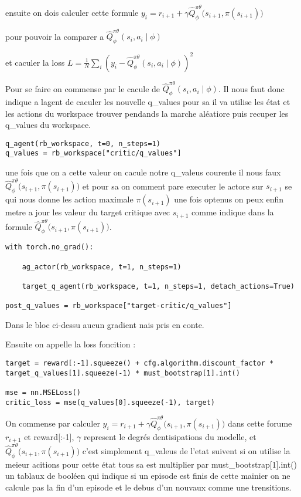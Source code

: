 \documentclass[12pt]{article}
\begin{document}
ensuite on dois calculer cette formule $ y_i = r_{i+1} + \gamma \hat{Q}^{\pi\theta}_{\phi} \big(s_{i+1}, \pi(s_{i+1})\big)$

pour pouvoir la comparer a $\hat{Q}_{\phi}^{\pi\theta}(s_i, a_i \mid \phi)$

et caculer la loss $L = \frac{1}{N} \sum_{i} \left( y_i - \hat{Q}_{\phi}^{\pi\theta}(s_i, a_i \mid \phi) \right)^2$

Pour se faire on commense par le cacule de $\hat{Q}_{\phi}^{\pi\theta}(s_i, a_i \mid \phi)$. 
Il nous faut donc indique a lagent de caculer les nouvelle q\_values pour sa il va utilise les état et les actions du workspace trouver pendands la marche aléatiore puis recuper les q\_values du workspace.



\begin{verbatim}
q_agent(rb_workspace, t=0, n_steps=1)
q_values = rb_workspace["critic/q_values"]
\end{verbatim}

une fois que on a cette valeur on cacule notre q\_valeus courente il nous faux $\hat{Q}^{\pi\theta}_{\phi} \big(s_{i+1}, \pi(s_{i+1})\big)$ et pour sa on comment pare executer le actore sur $s_{i+1}$ se qui nous donne les action maximale $\pi(s_{i+1})$ une fois optenus on peux enfin metre a jour les valeur du target critique avec $s_{i+1}$ comme indique dans la formule $\hat{Q}^{\pi\theta}_{\phi} \big(s_{i+1}, \pi(s_{i+1})\big)$.

\begin{verbatim}
with torch.no_grad():

	ag_actor(rb_workspace, t=1, n_steps=1)
 
	target_q_agent(rb_workspace, t=1, n_steps=1, detach_actions=True)

post_q_values = rb_workspace["target-critic/q_values"]
\end{verbatim}

Dans le bloc ci-dessu aucun gradient nais pris en conte.

Ensuite on appelle la loss foncition :

\begin{verbatim}
target = reward[:-1].squeeze() + cfg.algorithm.discount_factor * target_q_values[1].squeeze(-1) * must_bootstrap[1].int()  

mse = nn.MSELoss()
critic_loss = mse(q_values[0].squeeze(-1), target)
\end{verbatim}
On commense par calculer $ y_i = r_{i+1} + \gamma \hat{Q}^{\pi\theta}_{\phi} \big(s_{i+1}, \pi(s_{i+1})\big)$ dans cette forume $r_{i+1}$ et reward[:-1], $\gamma$ represent le degrés dentisipations du modelle, et $\hat{Q}^{\pi\theta}_{\phi} \big(s_{i+1}, \pi(s_{i+1})\big)$ c'est simplement q\_valeus de l'etat suivent si on utilise la meieur acitions pour cette état tous sa est multiplier par must\_bootstrap[1].int() un tablaux de booléen qui indique si un episode est finis de cette mainier on ne calcule pas la fin d'un episode et le debus d'un nouvaux comme une trensitions.
\\
\end{document}
